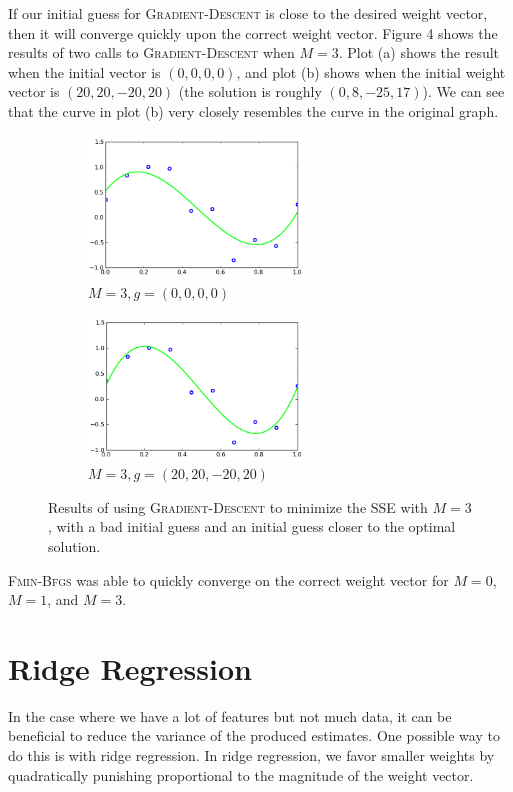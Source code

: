 \documentclass{sigchi}
\begin{document}
If our initial guess for \textsc{Gradient-Descent} is close to the desired weight vector, then it will converge quickly upon the correct weight vector. Figure 4 shows the results of two calls to \textsc{Gradient-Descent} when $M = 3$. Plot (a) shows the result when the initial vector is $(0, 0, 0, 0)$, and plot (b) shows when the initial weight vector is $(20, 20, -20, 20)$ (the solution is roughly $(0, 8, -25, 17)$). We can see that the curve in plot (b) very closely resembles the curve in the original graph.

\begin{figure}[!t]
\centering
\begin{subfigure}[b]{2.25in}
	\includegraphics[width = 2.25in]{m3_0.png}
	\caption{$M = 3, g = (0, 0, 0, 0)$}
\end{subfigure}
\begin{subfigure}[b]{2.25in}
	\includegraphics[width = 2.25in]{m3_1.png}
	\caption{$M = 3, g = (20, 20, -20, 20)$}
\end{subfigure}
\caption{Results of using \textsc{Gradient-Descent} to minimize the SSE with $M = 3$, with a bad initial guess and an initial guess closer to the optimal solution.}
\end{figure}

\textsc{Fmin-Bfgs} was able to quickly converge on the correct weight vector for $M = 0$, $M = 1$, and $M = 3$.

\section{Ridge Regression}

In the case where we have a lot of features but not much data, it can be beneficial to reduce the variance of the produced estimates. One possible way to do this is with ridge regression. In ridge regression, we favor smaller weights by quadratically punishing proportional to the magnitude of the weight vector.
\end{document}
